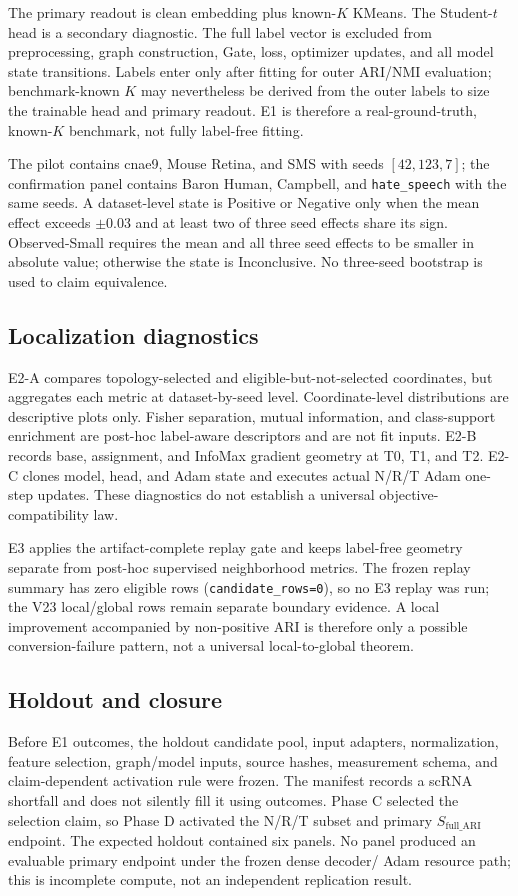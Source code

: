 The primary readout is clean embedding plus known-$K$ KMeans. The Student-$t$
head is a secondary diagnostic. The full label vector is excluded from
preprocessing, graph construction, Gate, loss, optimizer updates, and all model
state transitions. Labels enter only after fitting for outer ARI/NMI evaluation;
benchmark-known $K$ may nevertheless be derived from the outer labels to size
the trainable head and primary readout. E1 is therefore a real-ground-truth,
known-$K$ benchmark, not fully label-free fitting.

The pilot contains cnae9, Mouse Retina, and SMS with seeds $[42,123,7]$; the
confirmation panel contains Baron Human, Campbell, and \texttt{hate\_speech}
with the same seeds. A dataset-level state is Positive or Negative only when
the mean effect exceeds $\pm0.03$ and at least two of three seed effects share
its sign. Observed-Small requires the mean and all three seed effects to be
smaller in absolute value; otherwise the state is Inconclusive. No three-seed
bootstrap is used to claim equivalence.

\subsection{Localization diagnostics}

E2-A compares topology-selected and eligible-but-not-selected coordinates, but
aggregates each metric at dataset-by-seed level. Coordinate-level distributions
are descriptive plots only. Fisher separation, mutual information, and
class-support enrichment are post-hoc label-aware descriptors and are not fit
inputs. E2-B records base, assignment, and InfoMax gradient geometry at T0, T1,
and T2. E2-C clones model, head, and Adam state and executes actual N/R/T Adam
one-step updates. These diagnostics do not establish a universal
objective-compatibility law.

E3 applies the artifact-complete replay gate and keeps label-free geometry
separate from post-hoc supervised neighborhood metrics. The frozen replay
summary has zero eligible rows (\texttt{candidate\_rows=0}), so no E3 replay
was run; the V23 local/global rows remain separate boundary evidence. A local
improvement accompanied by non-positive ARI is therefore only a possible
conversion-failure pattern, not a universal local-to-global theorem.

\subsection{Holdout and closure}

Before E1 outcomes, the holdout candidate pool, input adapters, normalization,
feature selection, graph/model inputs, source hashes, measurement schema, and
claim-dependent activation rule were frozen. The manifest records a scRNA
shortfall and does not silently fill it using outcomes. Phase C selected the
selection claim, so Phase D activated the N/R/T subset and primary
$S_{\mathrm{full\_ARI}}$ endpoint. The expected holdout contained six panels.
No panel produced an evaluable primary endpoint under the frozen dense decoder/
Adam resource path; this is incomplete compute, not an independent replication
result.
